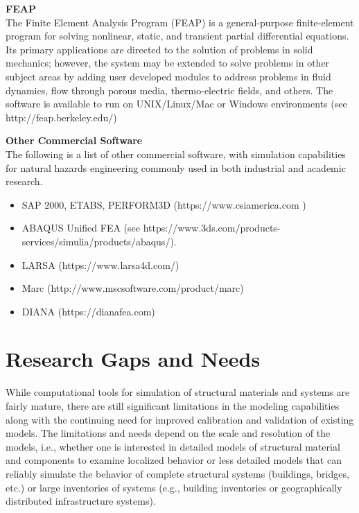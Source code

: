 \noindent\textbf{FEAP} \\The Finite Element Analysis Program (FEAP) is a general-purpose finite-element program for solving nonlinear, static, and transient partial differential equations. Its primary applications are directed to the solution of problems in solid mechanics; however, the system may be extended to solve problems in other subject areas by adding user developed modules to address problems in fluid dynamics, flow through porous media, thermo-electric fields, and others. The software is available to run on UNIX/Linux/Mac or Windows environments (see http://feap.berkeley.edu/)
\newline

\noindent\textbf{Other Commercial Software} \\The following is a list of other commercial software, with simulation capabilities for natural hazards engineering commonly used in both industrial and academic research.
\begin{itemize}
    \item SAP 2000, ETABS, PERFORM3D (https://www.csiamerica.com )
    \item ABAQUS Unified FEA (see https://www.3ds.com/products-services/simulia/products/abaqus/).
    \item LARSA (https://www.larsa4d.com/)
    \item Marc (http://www.mscsoftware.com/product/marc)
    \item DIANA (https://dianafea.com)
\end{itemize}

\section{Research Gaps and Needs}
\label{sec:resp_struct_gaps}

While computational tools for simulation of structural materials and systems are fairly mature, there are still significant limitations in the modeling capabilities along with the continuing need for improved calibration and validation of existing models. The limitations and needs depend on the scale and resolution of the models, i.e., whether one is interested in detailed models of structural material and components to examine localized behavior or less detailed models that can reliably simulate the behavior of complete structural systems (buildings, bridges, etc.) or large inventories of systems (e.g., building inventories or geographically distributed infrastructure systems). 

